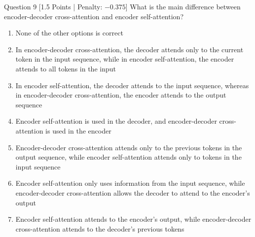 \documentclass[11pt,a4paper]{article}
\begin{document}
\vspace{0.3cm}

\begin{questionbox}{Question 9 \hfill [1.5 Points | Penalty: $-0.375$]}
What is the main difference between encoder-decoder cross-attention and encoder self-attention?
\begin{enumerate}[label=\alph*.,leftmargin=2em,itemsep=2pt]
    \item None of the other options is correct
    \item In encoder-decoder cross-attention, the decoder attends only to the current token in the input sequence, while in encoder self-attention, the encoder attends to all tokens in the input
    \item In encoder self-attention, the decoder attends to the input sequence, whereas in encoder-decoder cross-attention, the encoder attends to the output sequence
    \item Encoder self-attention is used in the decoder, and encoder-decoder cross-attention is used in the encoder
    \item Encoder-decoder cross-attention attends only to the previous tokens in the output sequence, while encoder self-attention attends only to tokens in the input sequence
    \item Encoder self-attention only uses information from the input sequence, while encoder-decoder cross-attention allows the decoder to attend to the encoder's output
    \item Encoder self-attention attends to the encoder's output, while encoder-decoder cross-attention attends to the decoder's previous tokens
\end{enumerate}
\end{questionbox}

\vspace{0.3cm}
\end{document}
